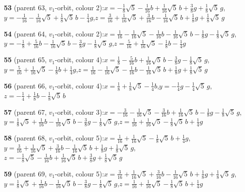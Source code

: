 \documentclass[10pt]{article}
\begin{document}
{\noindent\textbf{53} (parent 63, $v_1$-orbit, colour 2):\quad $x=-\tfrac{1}{8}\sqrt5-\tfrac{1}{16}b+\tfrac{1}{16}\sqrt5\,b+\tfrac{3}{8}g+\tfrac{1}{8}\sqrt5\,g$,\quad $y=-\tfrac{1}{16}-\tfrac{1}{16}\sqrt5+\tfrac{1}{8}\sqrt5\,b-\tfrac{1}{4}g$,\quad $z=\tfrac{3}{16}+\tfrac{1}{16}\sqrt5+\tfrac{3}{16}b-\tfrac{1}{16}\sqrt5\,b+\tfrac{1}{8}g+\tfrac{1}{8}\sqrt5\,g$\par\smallskip
\noindent\textbf{54} (parent 64, $v_1$-orbit, colour 2):\quad $x=\tfrac{1}{16}-\tfrac{1}{16}\sqrt5-\tfrac{1}{16}b-\tfrac{1}{16}\sqrt5\,b-\tfrac{1}{8}g-\tfrac{1}{8}\sqrt5\,g$,\quad $y=-\tfrac{1}{8}+\tfrac{5}{16}b-\tfrac{1}{16}\sqrt5\,b-\tfrac{3}{8}g-\tfrac{1}{8}\sqrt5\,g$,\quad $z=\tfrac{5}{16}+\tfrac{1}{16}\sqrt5-\tfrac{1}{8}b-\tfrac{1}{4}g$\par\smallskip
\noindent\textbf{55} (parent 65, $v_1$-orbit, colour 4):\quad $x=\tfrac{1}{8}-\tfrac{5}{16}b+\tfrac{1}{16}\sqrt5\,b-\tfrac{3}{8}g-\tfrac{1}{8}\sqrt5\,g$,\quad $y=\tfrac{5}{16}+\tfrac{1}{16}\sqrt5-\tfrac{1}{8}b+\tfrac{1}{4}g$,\quad $z=\tfrac{1}{16}-\tfrac{1}{16}\sqrt5-\tfrac{1}{16}b-\tfrac{1}{16}\sqrt5\,b+\tfrac{1}{8}g+\tfrac{1}{8}\sqrt5\,g$\par\smallskip
\noindent\textbf{56} (parent 66, $v_1$-orbit, colour 4):\quad $x=\tfrac{1}{8}+\tfrac{1}{8}\sqrt5-\tfrac{1}{4}b$,\quad $y=-\tfrac{1}{4}g-\tfrac{1}{4}\sqrt5\,g$,\quad $z=-\tfrac{1}{4}+\tfrac{1}{8}b-\tfrac{1}{8}\sqrt5\,b$\par\smallskip
\noindent\textbf{57} (parent 67, $v_1$-orbit, colour 3):\quad $x=-\tfrac{3}{16}-\tfrac{1}{16}\sqrt5-\tfrac{3}{16}b+\tfrac{1}{16}\sqrt5\,b-\tfrac{1}{8}g-\tfrac{1}{8}\sqrt5\,g$,\quad $y=\tfrac{1}{8}\sqrt5+\tfrac{1}{16}b-\tfrac{1}{16}\sqrt5\,b-\tfrac{3}{8}g-\tfrac{1}{8}\sqrt5\,g$,\quad $z=\tfrac{1}{16}+\tfrac{1}{16}\sqrt5-\tfrac{1}{8}\sqrt5\,b+\tfrac{1}{4}g$\par\smallskip
\noindent\textbf{58} (parent 68, $v_1$-orbit, colour 5):\quad $x=\tfrac{1}{16}+\tfrac{1}{16}\sqrt5-\tfrac{1}{8}\sqrt5\,b+\tfrac{1}{4}g$,\quad $y=\tfrac{3}{16}+\tfrac{1}{16}\sqrt5+\tfrac{3}{16}b-\tfrac{1}{16}\sqrt5\,b+\tfrac{1}{8}g+\tfrac{1}{8}\sqrt5\,g$,\quad $z=-\tfrac{1}{8}\sqrt5-\tfrac{1}{16}b+\tfrac{1}{16}\sqrt5\,b+\tfrac{3}{8}g+\tfrac{1}{8}\sqrt5\,g$\par\smallskip
\noindent\textbf{59} (parent 69, $v_1$-orbit, colour 5):\quad $x=\tfrac{3}{16}+\tfrac{1}{16}\sqrt5+\tfrac{3}{16}b-\tfrac{1}{16}\sqrt5\,b+\tfrac{1}{8}g+\tfrac{1}{8}\sqrt5\,g$,\quad $y=\tfrac{1}{8}\sqrt5+\tfrac{1}{16}b-\tfrac{1}{16}\sqrt5\,b-\tfrac{3}{8}g-\tfrac{1}{8}\sqrt5\,g$,\quad $z=\tfrac{1}{16}+\tfrac{1}{16}\sqrt5-\tfrac{1}{8}\sqrt5\,b+\tfrac{1}{4}g$\par\smallskip
}
\end{document}

